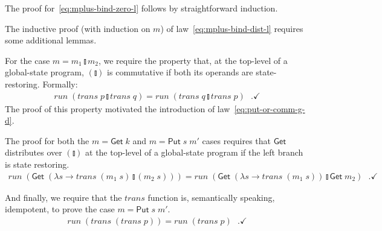 \documentclass{llncs}
\newcommand{\Conid}[1]{\mathit{#1}}
\newcommand{\Varid}[1]{\mathit{#1}}
\let\Varid\mathit
\let\Conid\mathsf
\begin{document}
The proof for~\eqref{eq:mplus-bind-zero-l} follows by straightforward induction.

The inductive proof (with induction on \ensuremath{\Varid{m}}) of law~\eqref{eq:mplus-bind-dist-l}
requires some additional lemmas.

For the case \ensuremath{\Varid{m}\mathrel{=}\Varid{m}_{1}\mathbin{\talloblong}\Varid{m}_{2}}, we require the property that, at the top-level
of a global-state program, \ensuremath{(\talloblong)} is commutative if both its operands are
state-restoring.
Formally:
\begin{align}
  \ensuremath{\Varid{run}\;(\Varid{trans}\;\Varid{p}\mathbin{\talloblong}\Varid{trans}\;\Varid{q})} = \ensuremath{\Varid{run}\;(\Varid{trans}\;\Varid{q}\mathbin{\talloblong}\Varid{trans}\;\Varid{p})}\mbox{~~.} \checkmark
\end{align}
The proof of this property motivated the introduction of
law~\eqref{eq:put-or-comm-g-d}.

The proof for both the \ensuremath{\Varid{m}\mathrel{=}\Conid{Get}\;\Varid{k}} and \ensuremath{\Varid{m}\mathrel{=}\Conid{Put}\;\Varid{s}\;\Varid{m'}} cases requires that \ensuremath{\Conid{Get}}
distributes
over \ensuremath{(\talloblong)} at the top-level of a global-state program if the left branch is
state restoring.
\begin{align}
\ensuremath{\Varid{run}\;(\Conid{Get}\;(\lambda \Varid{s}\to \Varid{trans}\;(\Varid{m}_{1}\;\Varid{s})\mathbin{\talloblong}(\Varid{m}_{2}\;\Varid{s})))} = \ensuremath{\Varid{run}\;(\Conid{Get}\;(\lambda \Varid{s}\to \Varid{trans}\;(\Varid{m}_{1}\;\Varid{s}))\mathbin{\talloblong}\Conid{Get}\;\Varid{m}_{2})} \label{eq:get-ret-mplus-g}\mbox{~~.} \checkmark
\end{align}

And finally, we require that the \ensuremath{\Varid{trans}} function is, semantically speaking,
idempotent, to prove the case \ensuremath{\Varid{m}\mathrel{=}\Conid{Put}\;\Varid{s}\;\Varid{m'}}.
\begin{align}
\ensuremath{\Varid{run}\;(\Varid{trans}\;(\Varid{trans}\;\Varid{p}))\mathrel{=}\Varid{run}\;(\Varid{trans}\;\Varid{p})} \label{eq:run-trans-trans} \mbox{~~.} \checkmark
\end{align}

\noindent
\end{document}
